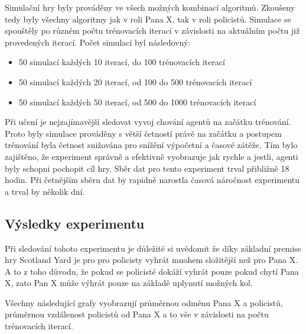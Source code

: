 Simulační hry byly prováděny ve všech možných kombinací algoritmů.
Zkoušeny tedy byly všechny algoritmy jak v roli Pana X, tak v roli policistů.
Simulace se spouštěly po různém počtu trénovacích iterací v závislosti na aktuálním počtu již provedených iterací.
Počet simulací byl následovný:
\begin{itemize}
  \item 50 simulací každých 10 iterací, do 100 trénovacích iterací
  \item 50 simulací každých 20 iterací, od 100 do 500 trénovacích iterací
  \item 50 simulací každých 50 iterací, od 500 do 1000 trénovacích iterací
\end{itemize}

Při učení je nejzajímavější sledovat vyvoj chování agentů na začátku trénování.
Proto byly simulace prováděny s větší četností právě na začátku a postupem trénování byla četnost snižována pro snížění výpočetní a časové zátěže.
Tím bylo zajištěno, že experiment správně a efektivně vyobrazuje jak rychle a jestli, agenti byly schopni pochopit cíl hry.
Sběr dat pro tento experiment trval přibližně 18 hodin.
Při četnějším sběru dat by rapidně narostla časová náročnost experimentu a trval by několik dní.

\subsection{Výsledky experimentu}
\label{subsec:vysledky-experimentu-1}



Při sledování tohoto experimentu je důležité si uvědomit že díky základní premise hry Scotland Yard je pro pro policisty vyhrát mnohem složitější než pro Pana X\@.
A to z toho důvodu, že pokud se policisté dokáží vyhrát pouze pokud chytí Pana X, zato Pan X může výhrát pouze na základě uplynutí možných kol.

Všechny následující grafy vyobrazují průměrnou odměnu Pana X a policistů, průměrnou vzdálenost policistů od Pana X a to vše v závislosti na počtu trénovacích iterací.

